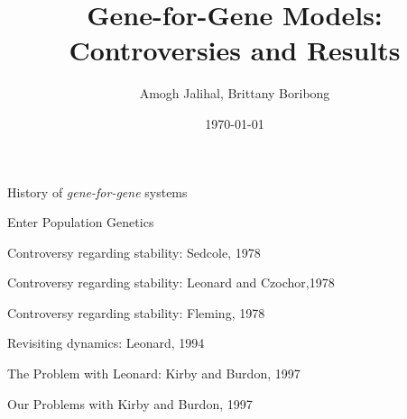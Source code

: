 \documentclass[presentation]{beamer}
\author{Amogh Jalihal, Brittany Boribong}
\date{\today}
\title{Gene-for-Gene Models: Controversies and Results}
\begin{document}
\begin{frame}[label=sec-1]{History of \emph{gene-for-gene} systems}
\end{frame}

\begin{frame}[label=sec-2]{Enter Population Genetics}
\end{frame}
\begin{frame}[label=sec-3]{Controversy regarding stability: Sedcole, 1978}
\end{frame}
\begin{frame}[label=sec-4]{Controversy regarding stability: Leonard and Czochor,1978}
\end{frame}
\begin{frame}[label=sec-5]{Controversy regarding stability: Fleming, 1978}
\end{frame}
\begin{frame}[label=sec-6]{Revisiting dynamics: Leonard, 1994}
\end{frame}
\begin{frame}[label=sec-7]{The Problem with Leonard: Kirby and Burdon, 1997}
\end{frame}
\begin{frame}[label=sec-8]{Our Problems with Kirby and Burdon, 1997}

\end{frame}
\begin{References}
  

\end{References}
\end{document}
